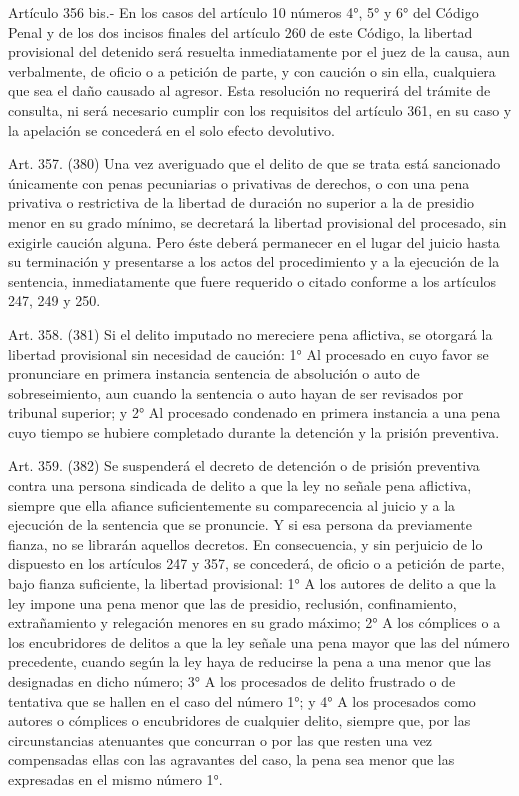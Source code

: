     Artículo 356 bis.- En los casos del artículo 10 números 4°, 5° y 6° del Código Penal y de los dos incisos finales del artículo 260 de este Código, la libertad provisional del detenido será resuelta inmediatamente por el juez de la causa, aun verbalmente, de oficio o a petición de parte, y con caución o sin ella, cualquiera que sea el daño causado al agresor. Esta resolución no requerirá del trámite de consulta, ni será necesario cumplir con los requisitos del artículo 361, en su caso y la apelación se concederá en el solo efecto devolutivo.

    Art. 357. (380) Una vez averiguado que el delito de que se trata está sancionado únicamente con penas pecuniarias o privativas de derechos, o con una pena privativa o restrictiva de la libertad de duración no superior a la de presidio menor en su grado mínimo, se decretará la libertad provisional del procesado, sin exigirle caución alguna.
    Pero éste deberá permanecer en el lugar del juicio hasta su terminación y presentarse a los actos del procedimiento y a la ejecución de la sentencia, inmediatamente que fuere requerido o citado conforme a los artículos 247, 249 y 250.

    Art. 358. (381) Si el delito imputado no mereciere pena aflictiva, se otorgará la libertad provisional sin necesidad de caución:
    1° Al procesado en cuyo favor se pronunciare en primera instancia sentencia de absolución o auto de sobreseimiento, aun cuando la sentencia o auto hayan de ser revisados por tribunal superior; y
    2° Al procesado condenado en primera instancia a una pena cuyo tiempo se hubiere completado durante la detención y la prisión preventiva.




    Art. 359. (382) Se suspenderá el decreto de detención o de prisión preventiva contra una persona sindicada de delito a que la ley no señale pena aflictiva, siempre que ella afiance suficientemente su comparecencia al juicio y a la ejecución de la sentencia que se pronuncie. Y si esa persona da previamente fianza, no se librarán aquellos decretos.
    En consecuencia, y sin perjuicio de lo dispuesto en los artículos 247 y 357, se concederá, de oficio o a petición de parte, bajo fianza suficiente, la libertad provisional:
    1° A los autores de delito a que la ley impone una pena menor que las de presidio, reclusión,  confinamiento, extrañamiento y relegación menores en su grado máximo;
    2° A los cómplices o a los encubridores de delitos a que la ley señale una pena mayor que las del número precedente, cuando según la ley haya de reducirse la pena a una menor que las designadas en dicho número;
    3° A los procesados de delito frustrado o de tentativa que se hallen en el caso del número 1°; y
    4° A los procesados como autores o cómplices o encubridores de cualquier delito, siempre que, por las circunstancias atenuantes que concurran o por las que resten una vez compensadas ellas con las agravantes del caso, la pena sea menor que las expresadas en el mismo número 1°.




